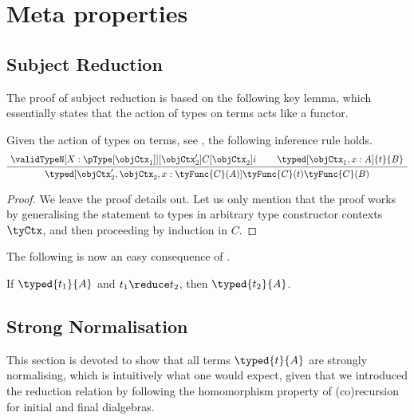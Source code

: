 \documentclass[preprint]{sigplanconf}
\begin{document}
\begin{definition}
\end{definition}



%
 \section{Meta properties}
\label{sec:meta-prop}

\subsection{Subject Reduction}
\label{sec:subject-reduction}

The proof of subject reduction is based on the following key lemma,
which essentially states that the action of types on terms acts like a
functor.
\begin{lemma}
  \label{lem:correctness-type-action}
  Given the action of types on terms, see ,
  the following inference rule holds.
  \begin{equation*}
    \AxiomC{$
      \validTypeN[X: {\pType[\objCtx_1]}][\objCtx_2']{C}[\objCtx_2]{i}$}
    \AxiomC{$\typed[\objCtx_1, x : A]{t}{B}$}
    \BinaryInfC{$
      \typed[\objCtx_2', \objCtx_2, x : \tyFunc{C}(A)]
      {\tyFunc{C}(t)}{\tyFunc{C}(B)}$}
    \DisplayProof
  \end{equation*}
\end{lemma}
\begin{proof}
  We leave the proof details out.
  Let us only mention that the proof works by
  generalising the statement to types in arbitrary type constructor contexts
  $\tyCtx$, and then proceeding by induction in $C$.
\end{proof}

The following is now an easy consequence of .
\begin{theorem}
  If $\cramped{\typed{t_1}{A}}$ and $t_1 \reduce t_2$,
  then $\typed{t_2}{A}$.
\end{theorem}

\subsection{Strong Normalisation}
\label{sec:sn}

This section is devoted to show that all terms $\typed{t}{A}$ are strongly
normalising, which is intuitively what one would expect, given that we
introduced the reduction relation by following the homomorphism property
of (co)recursion for initial and final dialgebras.
\end{document}
